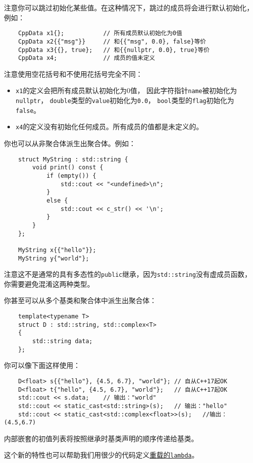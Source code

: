 注意你可以跳过初始化某些值。在这种情况下，跳过的成员将会进行默认初始化，例如：
\begin{lstlisting}
    CppData x1{};           // 所有成员默认初始化为0值
    CppData x2{{"msg"}}     // 和{{"msg", 0.0}, false}等价
    CppData x3{{}, true};   // 和{{nullptr, 0.0}, true}等价
    CppData x4;             // 成员的值未定义
\end{lstlisting}
注意使用空花括号和不使用花括号完全不同：
\begin{itemize}
    \item \texttt{x1}的定义会把所有成员默认初始化为0值，
    因此字符指针\texttt{name}被初始化为\texttt{nullptr}，
    \texttt{double}类型的\texttt{value}初始化为\texttt{0.0}，
    \texttt{bool}类型的\texttt{flag}初始化为\texttt{false}。
    \item \texttt{x4}的定义没有初始化任何成员。所有成员的值都是未定义的。
\end{itemize}
你也可以从非聚合体派生出聚合体。例如：
\begin{lstlisting}
    struct MyString : std::string {
        void print() const {
            if (empty()) {
                std::cout << "<undefined>\n";
            }
            else {
                std::cout << c_str() << '\n';
            }
        }
    };

    MyString x{{"hello"}};
    MyString y{"world"};
\end{lstlisting}
注意这不是通常的具有多态性的\texttt{public}继承，因为\texttt{std::string}没有虚成员函数，
你需要避免混淆这两种类型。

你甚至可以从多个基类和聚合体中派生出聚合体：
\begin{lstlisting}
    template<typename T>
    struct D : std::string, std::complex<T>
    {
        std::string data;
    };
\end{lstlisting}
你可以像下面这样使用：
\begin{lstlisting}
    D<float> s{{"hello"}, {4.5, 6.7}, "world"}; // 自从C++17起OK
    D<float> t{"hello", {4.5, 6.7}, "world"};   // 自从C++17起OK
    std::cout << s.data;    // 输出："world"
    std::cout << static_cast<std::string>(s);   // 输出："hello"
    std::cout << static_cast<std::complex<float>>(s);   //输出：(4.5,6.7)
\end{lstlisting}
内部嵌套的初值列表将按照继承时基类声明的顺序传递给基类。

这个新的特性也可以帮助我们用很少的代码定义\hyperref[ch14.1]{重载的\texttt{lambda}}。


